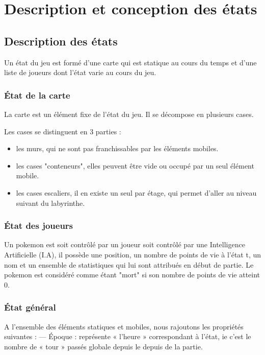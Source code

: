 \documentclass[a4paper,12pt]{article}
\begin{document}
    \clearpage
    \section{Description et conception des états}
    
    \subsection{Description des états}
    Un état du jeu est formé d'une carte qui est statique au cours du temps et d'une liste de joueurs dont l'état varie au cours du jeu.
    
     \subsubsection{État de la carte}
     
     La carte est un élément fixe de l'état du jeu. Il se décompose en plusieurs cases.
    
     Les cases se distinguent en 3 parties : \begin{itemize}
    \item les murs, qui ne sont pas franchissables par les éléments mobiles.
    \item les cases "conteneurs", elles peuvent être vide ou occupé par un seul élément mobile.
    \item les cases escaliers, il en existe un seul par étage, qui permet d'aller au niveau suivant du labyrinthe.
    
    \end{itemize}

    \subsubsection{État des joueurs}
    Un pokemon est soit contrôlé par un joueur soit contrôlé par une Intelligence Artificielle (I.A), il possède une position, un nombre de points de vie à l'état t, un nom et un ensemble de statistiques qui lui sont attribués en début de partie. Le pokemon est considéré comme étant "mort" si son nombre de points de vie atteint 0.
    
    \subsubsection{État général}
    A l’ensemble des éléments statiques et mobiles, nous rajoutons les propriétés suivantes :
    — Époque : représente « l’heure » correspondant à l’état, ie c’est le nombre de « tour » passés
    globale depuis le depuis de la partie.
\end{document}
